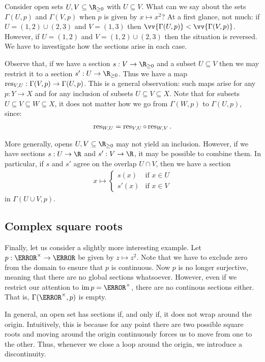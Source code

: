 \documentclass{article}
\begin{document}
Consider open sets $U,V\subseteq\R_{\geq 0}$ with
$U\subseteq V$. What can we say about the sets $\Gamma(U,p)$ and
$\Gamma(V,p)$ when $p$ is given by $x\mapsto x^2$? At a first glance,
not much: if $U=(1,2)\cup(2,3)$ and $V=(1,3)$ then
$\vv{\Gamma(U,p)}<\vv{\Gamma(V,p)}$. However, if
$U=(1,2)$ and $V=(1,2)\cup(2,3)$ then the situation is reversed.
We have to investigate how the sections arise in each case.

Observe that, if we have a section $s:V\to\R_{\geq 0}$ and a subset
$U\subseteq V$ then we may restrict it to a section $s':U\to\R_{\geq 0}$.
Thus we have a map $\operatorname{res}_{V,U}:\Gamma(V,p)\to\Gamma(U,p)$. This is a
general observation: such maps arise for any $p:Y\to X$ and for
any inclusion of subsets $U\subseteq V\subseteq X$. Note that
for subsets $U\subseteq V\subseteq W\subseteq X$, it does not matter
how we go from $\Gamma(W,p)$ to $\Gamma(U,p)$, since:
\begin{align*}
  \operatorname{res}_{W,U} = \operatorname{res}_{V,U}\circ\operatorname{res}_{W,V}.
\end{align*}

More generally, opens $U,V\subseteq\R_{\geq 0}$ may not yield an
inclusion. However, if we have sections $s:U\to\R$ and $s':V\to\R$,
it may be possible to combine them. In particular, if $s$ and $s'$
agree on the overlap $U\cap V$, then we have a section
\begin{align*}
  x \mapsto \begin{cases}
    s(x) & \text{if }x\in U \\
    s'(x) & \text{if }x\in V
  \end{cases}
\end{align*}
in $\Gamma(U\cup V,p)$.

\subsection{Complex square roots}

Finally, let us consider a slightly more interesting example.
Let $p:\C^\times\to\C$ be given by $z\mapsto z^2$. Note that we
have to exclude zero from the domain to ensure that $p$ is continuous.
Now $p$ is no longer surjective, meaning that there are no global
sections whatsoever. However, even if we restrict our attention
to $\im p =\C^\times$, there are no continous sections either. That is,
$\Gamma(\C^\times,p)$ is empty.

In general, an open set has sections if, and only if, it does not wrap
around the origin. Intuitively, this is because for any point there are
two possible square roots and moving around the origin continuously
forces us to move from one to the other. Thus, whenever we close a loop
around the origin, we introduce a discontinuity.
\end{document}
